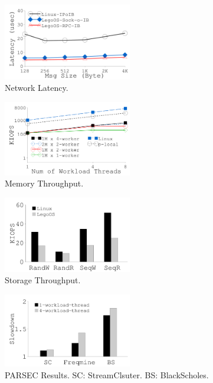 {
\begin{figure}[th]
\begin{center}
\centerline{\includegraphics[width=0.5\textwidth]{lego/Figures/g_plot_LEGO_latency.pdf}}
\caption[Network Latency.]{Network Latency.}
\label{fig-net-latency}
\end{center}
\end{figure}
}
{
\begin{figure}[th]
\begin{center}
\centerline{\includegraphics[width=0.5\textwidth]{lego/Figures/g_plot_LEGO_iops_memory.pdf}}
\caption[Memory Throughput]{Memory Throughput.}
\label{fig-iops-memory}
\end{center}
\end{figure}
}
{
\begin{figure}[th]
\begin{center}
\centerline{\includegraphics[width=0.5\textwidth]{lego/Figures/g_plot_LEGO_iops_storage.pdf}}
\caption[Storage Throughput.]{Storage Throughput.} 
\label{fig-iops-storage}
\end{center}
\end{figure}
}
{
\begin{figure}[th]
\begin{center}
\centerline{\includegraphics[width=0.5\textwidth]{lego/Figures/g_plot_LEGO_parsec.pdf}}
\caption[PARSEC Results.]{PARSEC Results. SC: StreamClsuter. BS: BlackScholes.}
\label{fig-parsec}
\end{center}
\end{figure}
}